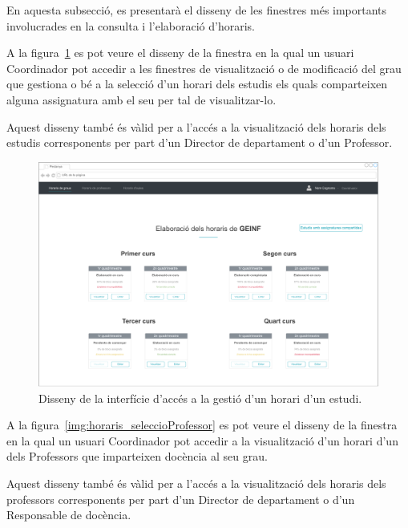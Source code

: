 \documentclass[a4paper,12pt]{ThesisStyle}
\begin{document}
En aquesta subsecció, es presentarà el disseny de les finestres més importants involucrades en la consulta i l'elaboració d'horaris.

A la figura~\ref{img:horaris_seleccioEstudi} es pot veure el disseny de la finestra en la qual un usuari Coordinador pot accedir a les finestres de visualització o de modificació del grau que gestiona o bé a la selecció d'un horari dels estudis els quals comparteixen alguna assignatura amb el seu per tal de visualitzar-lo.

Aquest disseny també és vàlid per a l'accés a la visualització dels horaris dels estudis corresponents per part d'un Director de departament o d'un Professor.

\begin{figure}[H]
	\centering
	\includegraphics[width=\textwidth]{assets/interfaces/horaris/seleccioEstudi.pdf}
	\caption{\label{img:horaris_seleccioEstudi}Disseny de la interfície d'accés a la gestió d'un horari d'un estudi.}
\end{figure}

A la figura~\ref{img:horaris_seleccioProfessor} es pot veure el disseny de la finestra en la qual un usuari Coordinador pot accedir a la visualització d'un horari d'un dels Professors que imparteixen docència al seu grau.

Aquest disseny també és vàlid per a l'accés a la visualització dels horaris dels professors corresponents per part d'un Director de departament o d'un Responsable de docència.
\end{document}
